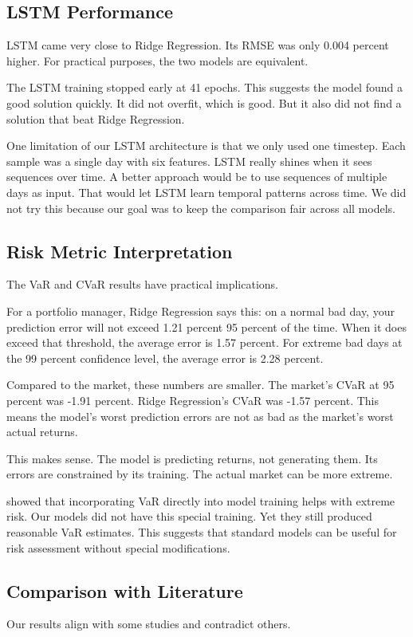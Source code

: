 \documentclass[12pt,a4paper]{article}
\begin{document}
\subsection{LSTM Performance}
LSTM came very close to Ridge Regression. Its RMSE was only 0.004 percent higher. For practical purposes, the two models are equivalent.

The LSTM training stopped early at 41 epochs. This suggests the model found a good solution quickly. It did not overfit, which is good. But it also did not find a solution that beat Ridge Regression.

One limitation of our LSTM architecture is that we only used one timestep. Each sample was a single day with six features. LSTM really shines when it sees sequences over time. A better approach would be to use sequences of multiple days as input. That would let LSTM learn temporal patterns across time. We did not try this because our goal was to keep the comparison fair across all models.

\subsection{Risk Metric Interpretation}
The VaR and CVaR results have practical implications.

For a portfolio manager, Ridge Regression says this: on a normal bad day, your prediction error will not exceed 1.21 percent 95 percent of the time. When it does exceed that threshold, the average error is 1.57 percent. For extreme bad days at the 99 percent confidence level, the average error is 2.28 percent.

Compared to the market, these numbers are smaller. The market's CVaR at 95 percent was -1.91 percent. Ridge Regression's CVaR was -1.57 percent. This means the model's worst prediction errors are not as bad as the market's worst actual returns.

This makes sense. The model is predicting returns, not generating them. Its errors are constrained by its training. The actual market can be more extreme.

\citet{zhang2024} showed that incorporating VaR directly into model training helps with extreme risk. Our models did not have this special training. Yet they still produced reasonable VaR estimates. This suggests that standard models can be useful for risk assessment without special modifications.

\subsection{Comparison with Literature}
Our results align with some studies and contradict others.
\end{document}
